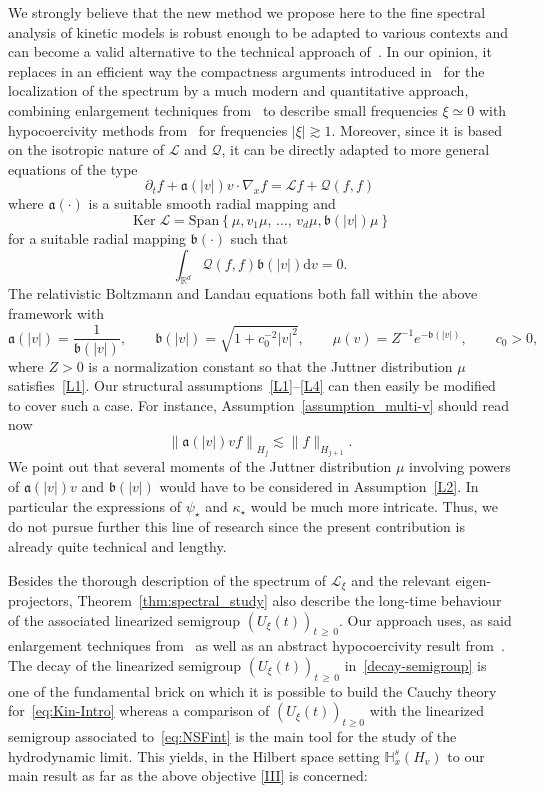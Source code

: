 \documentclass[AHL,Unicode,longabstracts,published]{cedram}
\DeclareMathOperator{\nul}{Ker}
\renewcommand{\d}{\mathrm{d}}
\newcommand{\rSpan}{\mathrm{Span}}
\newcommand{\R}{\mathbb{R}}
\newcommand{\bbH}{\mathbb{H}}
\newcommand{\fka}{\mathfrak{a}}
\newcommand{\fkb}{\mathfrak{b}}
\newcommand{\LL}{\mathcal{L}}
\newcommand{\QQ}{\mathcal{Q}}
\newcommand{\Ss}{H}
\renewcommand*\ge{\geqslant}
\renewcommand*\geq{\geqslant}
\begin{document}
We strongly believe that the new method we propose here to the fine spectral analysis of kinetic models is robust enough to be adapted to various contexts and can become a valid alternative to the technical approach of~\cite{EP1975}. In our opinion, it replaces in an efficient way the compactness arguments introduced in~\cite{EP1975} for the localization of the spectrum by a much modern and quantitative approach, combining enlargement techniques from~\cite{GMM2017} to describe small frequencies $\xi\simeq 0$ with hypocoercivity methods from~\cite{D2011} for frequencies $|\xi| \gtrsim 1.$ Moreover, since it is based on the isotropic nature of $\LL$ and $\QQ$, it can be directly adapted to more general equations of the type
\[
\partial_t f+ \fka(|v|) v \cdot \nabla_x f=\LL f+ \QQ(f,f)
\]
where $\fka(\cdot)$ is a suitable smooth radial mapping and
\[
\nul \LL=\rSpan\left\{\mu,v_1\mu,\,\ldots,\,v_d\mu,\fkb(|v|)\mu\right\}
\]
for a suitable radial mapping $\fkb(\cdot)$ such that
\[
\int_{\R^d}\QQ(f,f)\fkb(|v|)\d v=0.
\]
The relativistic Boltzmann and Landau equations both fall within the above framework with
\[
\fka(|v|)=\frac{1}{\fkb(|v|)}, \qquad \fkb(|v|)=\sqrt{1+c_0^{-2}|v|^2}, \qquad \mu(v)=Z^{-1}e^{-\fkb(|v|)}, \qquad c_0 > 0,
\]
where $Z >0$ is a normalization constant so that the Juttner distribution $\mu$ satisfies~\eqref{L1}. Our structural assumptions~\eqref{L1}--\eqref{L4} can then easily be modified to cover such a case. For instance, Assumption~\ref{assumption_multi-v} should read now
\[
\left\|\fka(|v|)vf\right\|_{\Ss_j} \lesssim \|f\|_{\Ss_{j+1}}.
\]
We point out that several moments of the Juttner distribution $\mu$ involving powers of $\fka(|v|)v$ and $\fkb(|v|)$ would have to be considered in Assumption~\eqref{L2}. In particular the expressions of $\psi_\star$ and $\kappa_\star$ would be much more intricate. Thus, we do not pursue further this line of research since the present contribution is already quite technical and lengthy.
\bigskip

Besides the thorough description of the spectrum of $\LL_\xi$ and the relevant eigen-projectors, Theorem~\ref{thm:spectral_study} also describe the long-time behaviour of the associated linearized semigroup $\left(U_\xi(t)\right)_{t\,\ge\,0}$. Our approach uses, as said enlargement techniques from~\cite{GMM2017} as well as an abstract hypocoercivity result from~\cite{D2011}. The decay of the linearized semigroup $\left(U_{\xi}(t)\right)_{t\,\geq\,0}$ in~\eqref{decay-semigroup} is one of the fundamental brick on which it is possible to build the Cauchy theory for~\eqref{eq:Kin-Intro} whereas a comparison of $(U_\xi(t))_{t \geq0}$ with the linearized semigroup associated to~\eqref{eq:NSFint} is the main tool for the study of the hydrodynamic limit. This yields, in the Hilbert space setting $\bbH^s_x(\Ss_v)$ to our main result as far as the above objective \eqref{III} is concerned:
\end{document}
